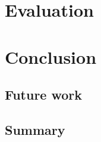 \documentclass[Report.tex]{subfiles}
\begin{document}
\section{Evaluation}


\section{Conclusion}




\subsection{Future work}



\subsection{Summary}
\end{document}

